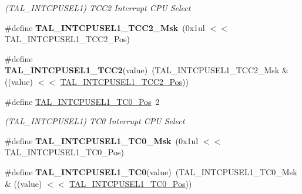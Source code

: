 \begin{DoxyCompactItemize}
\begin{DoxyCompactList}\small\item\em (T\+A\+L\+\_\+\+I\+N\+T\+C\+P\+U\+S\+E\+L1) T\+C\+C2 Interrupt C\+P\+U Select \end{DoxyCompactList}\item 
\hypertarget{group___s_a_m_l21___t_a_l_ga057ac92bcab042f07561da38bba7b363}{}\#define {\bfseries T\+A\+L\+\_\+\+I\+N\+T\+C\+P\+U\+S\+E\+L1\+\_\+\+T\+C\+C2\+\_\+\+Msk}~(0x1ul $<$$<$ T\+A\+L\+\_\+\+I\+N\+T\+C\+P\+U\+S\+E\+L1\+\_\+\+T\+C\+C2\+\_\+\+Pos)\label{group___s_a_m_l21___t_a_l_ga057ac92bcab042f07561da38bba7b363}

\item 
\hypertarget{group___s_a_m_l21___t_a_l_ga6700962c376ddd512aefc1fb6a731a5e}{}\#define {\bfseries T\+A\+L\+\_\+\+I\+N\+T\+C\+P\+U\+S\+E\+L1\+\_\+\+T\+C\+C2}(value)~(T\+A\+L\+\_\+\+I\+N\+T\+C\+P\+U\+S\+E\+L1\+\_\+\+T\+C\+C2\+\_\+\+Msk \& ((value) $<$$<$ \hyperlink{group___s_a_m_l21___t_a_l_gafaae7927a323afa5070770fc69b87044}{T\+A\+L\+\_\+\+I\+N\+T\+C\+P\+U\+S\+E\+L1\+\_\+\+T\+C\+C2\+\_\+\+Pos}))\label{group___s_a_m_l21___t_a_l_ga6700962c376ddd512aefc1fb6a731a5e}

\item 
\hypertarget{group___s_a_m_l21___t_a_l_ga928f5208071d2811db071c2b0c64181b}{}\#define \hyperlink{group___s_a_m_l21___t_a_l_ga928f5208071d2811db071c2b0c64181b}{T\+A\+L\+\_\+\+I\+N\+T\+C\+P\+U\+S\+E\+L1\+\_\+\+T\+C0\+\_\+\+Pos}~2\label{group___s_a_m_l21___t_a_l_ga928f5208071d2811db071c2b0c64181b}

\begin{DoxyCompactList}\small\item\em (T\+A\+L\+\_\+\+I\+N\+T\+C\+P\+U\+S\+E\+L1) T\+C0 Interrupt C\+P\+U Select \end{DoxyCompactList}\item 
\hypertarget{group___s_a_m_l21___t_a_l_gab35cf2df058156c4067b1e0ca947f8da}{}\#define {\bfseries T\+A\+L\+\_\+\+I\+N\+T\+C\+P\+U\+S\+E\+L1\+\_\+\+T\+C0\+\_\+\+Msk}~(0x1ul $<$$<$ T\+A\+L\+\_\+\+I\+N\+T\+C\+P\+U\+S\+E\+L1\+\_\+\+T\+C0\+\_\+\+Pos)\label{group___s_a_m_l21___t_a_l_gab35cf2df058156c4067b1e0ca947f8da}

\item 
\hypertarget{group___s_a_m_l21___t_a_l_ga3040b3abaae79df46e47751579595721}{}\#define {\bfseries T\+A\+L\+\_\+\+I\+N\+T\+C\+P\+U\+S\+E\+L1\+\_\+\+T\+C0}(value)~(T\+A\+L\+\_\+\+I\+N\+T\+C\+P\+U\+S\+E\+L1\+\_\+\+T\+C0\+\_\+\+Msk \& ((value) $<$$<$ \hyperlink{group___s_a_m_l21___t_a_l_ga928f5208071d2811db071c2b0c64181b}{T\+A\+L\+\_\+\+I\+N\+T\+C\+P\+U\+S\+E\+L1\+\_\+\+T\+C0\+\_\+\+Pos}))\label{group___s_a_m_l21___t_a_l_ga3040b3abaae79df46e47751579595721}


\end{DoxyCompactItemize}

